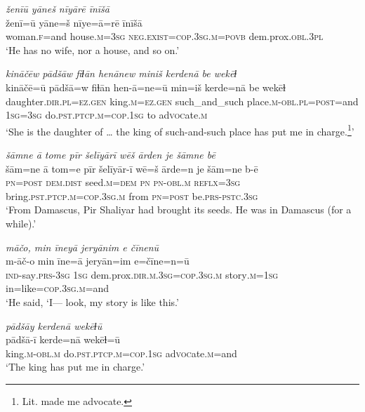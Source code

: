 \ea \label{ZP.87}
\textit{ženīū yāneš nīyārē īnīšā} \\ 
\gll ženī=ū yāne=š nīye=ā=rē īnīšā \\ 
 woman\textsc{.f}=and house\textsc{.m}\textsc{=3sg} \textsc{\textsc{neg.}exist}\textsc{=cop}\textsc{.3sg}\textsc{.m}\textsc{=\textsc{povb}} dem.prox\textsc{.obl}\textsc{.3pl} \\ 
\glt `He has no wife, nor a house, and so on.'
\z 
 
\ea \label{ZP.89}
\textit{kināčēw pādšāw fiɫān henānew miniš kerdenā be wekēɫ} \\ 
\gll kināčē=ū pādšā=w fiɫān hen-ā=ne=ū min=iš kerde=nā be wekēɫ \\ 
 daughter\textsc{.dir}\textsc{.pl}\textsc{\textsc{=ez.gen}} king\textsc{.m}\textsc{\textsc{=ez.gen}} such\_and\_such place\textsc{.m}\textsc{-obl}\textsc{.pl}\textsc{=\textsc{post}}=and \textsc{1sg}\textsc{=3sg} do\textsc{.pst}\textsc{.ptcp}\textsc{.m}\textsc{=cop}\textsc{.\textsc{1sg}} to ad\textsc{voc}ate\textsc{.m} \\ 
\glt `She is the daughter of … the king of such-and-such place has put me in charge.\footnote{Lit. made me advocate.}'
\z 
 
\ea \label{ZP.95}
\textit{šāmne ā tome pīr šelīyārī wēš ārden je šāmne bē} \\ 
\gll šām=ne ā tom=e pīr šelīyār-ī wē=š ārde=n je šām=ne b-ē \\ 
 \textsc{pn}\textsc{=\textsc{post}} \textsc{dem.dist} seed\textsc{.m}\textsc{=dem} \textsc{pn} \textsc{pn}\textsc{-obl}\textsc{.m} \textsc{reflx}\textsc{=3sg} bring\textsc{.pst}\textsc{.ptcp}\textsc{.m}\textsc{=cop}\textsc{.3sg}\textsc{.m} from \textsc{pn}\textsc{=\textsc{post}} be\textsc{.prs}\textsc{-pstc}\textsc{.3sg} \\ 
\glt `From Damascus, Pir Shaliyar had brought its seeds. He was in Damascus (for a while).'
\z 
 
\ea \label{ZP.98}
\textit{māčo, min īneyā jeryānim e čīnenū} \\ 
\gll m-āč-o min īne=ā jeryān=im e=čīne=n=ū \\ 
 \textsc{ind-}say\textsc{.prs}\textsc{-3sg} \textsc{1sg} dem.prox\textsc{.dir}\textsc{.m}\textsc{.3sg}\textsc{=cop}\textsc{.3sg}\textsc{.m} story\textsc{.m}\textsc{=\textsc{1sg}} in=like\textsc{=cop}\textsc{.3sg}\textsc{.m}=and \\ 
\glt `He said, ‘I— look, my story is like this.'
\z 
 
\ea \label{ZP.99}
\textit{pādšāy kerdenā wekēɫū} \\ 
\gll pādšā-ī kerde=nā wekēɫ=ū \\ 
 king\textsc{.m}\textsc{-obl}\textsc{.m} do\textsc{.pst}\textsc{.ptcp}\textsc{.m}\textsc{=cop}\textsc{.\textsc{1sg}} ad\textsc{voc}ate\textsc{.m}=and \\ 
\glt `The king has put me in charge.'
\z 
 
